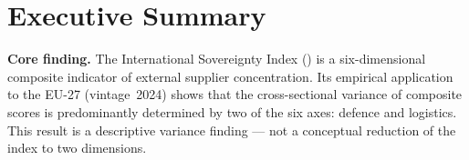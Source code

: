 
\section{Executive Summary}
\label{sec:summary}

\begin{sloppypar}
\textbf{Core finding.}
The International Sovereignty Index (\ISI) is a six-dimensional
composite indicator of external supplier concentration.  Its
empirical application to the EU-27 (vintage~2024) shows that the
cross-sectional variance of composite scores is predominantly
determined by two of the six axes: defence and logistics.  This
result is a descriptive variance finding --- not a conceptual
reduction of the index to two dimensions.
\end{sloppypar}

